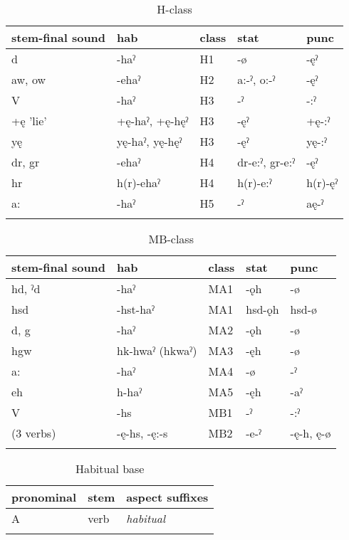 \lipsum[1-1]

\begin{table}
\caption{H-class}
\label{tab:1:Hclass}\scriptsize{
\begin{tabularx}{\textwidth}{XXXXX}
\lsptoprule
stem-final sound & hab &  class & stat & punc \\
\midrule
d & {}-haˀ & H1 & {}-ø & {}-ęˀ\\
aw, ow & {}-ehaˀ & H2 & a:-ˀ, o:-ˀ & {}-ęˀ\\
V & {}-haˀ & H3 & {}-ˀ & {}-:ˀ\\
+ę 'lie' & +ę-haˀ, +ę-hęˀ & H3 & {}-ęˀ & +ę-:ˀ\\
yę & yę-haˀ, yę-hęˀ & H3 & {}-ęˀ & yę-:ˀ\\
dr, gr & {}-ehaˀ & H4 & dr{}-e:ˀ, gr{}-e:ˀ & {}-ęˀ\\
hr & h(r)-ehaˀ & H4 & h(r)-e:ˀ & h(r)-ęˀ\\
a: & {}-haˀ & H5 & {}-ˀ & aę-ˀ\\
\lspbottomrule
\end{tabularx}}
\end{table}


\begin{table}
\caption{MB-class}
\label{tab:1:MBclass}
\scriptsize{
\begin{tabularx}{\textwidth}{XXXXX}
\lsptoprule
stem-final sound & hab &  class & stat & punc \\
\midrule
hd, ˀd & {}-haˀ & MA1 & {}-ǫh & {}-ø\\
hsd & {}-hst-haˀ & MA1 & hsd-ǫh & hsd{}-ø\\
d, g & {}-haˀ & MA2 & {}-ǫh & {}-ø\\
hgw & hk-hwaˀ (hkwaˀ) & MA3 & {}-ęh & {}-ø\\
a: & {}-haˀ & MA4 & {}-ø & {}-ˀ\\
eh & h{}-haˀ & MA5 & {}-ęh & {}-aˀ\\
V & {}-hs & MB1 & {}-ˀ & {}-:ˀ\\
(3 verbs) & {}-ę-hs, -ę:-s & MB2 & {}-e-ˀ & {}-ę-h, ę-ø\\
\lspbottomrule
\end{tabularx}}
\end{table}


\begin{table}
\caption{Habitual base}
\label{tab:1:habbase}
\scriptsize{
\begin{tabularx}{.66\textwidth}{XXX}
\lsptoprule
pronominal & stem & aspect suffixes\\
\midrule
A & verb & {\itshape habitual}\\
\lspbottomrule
\end{tabularx}}
\end{table}

